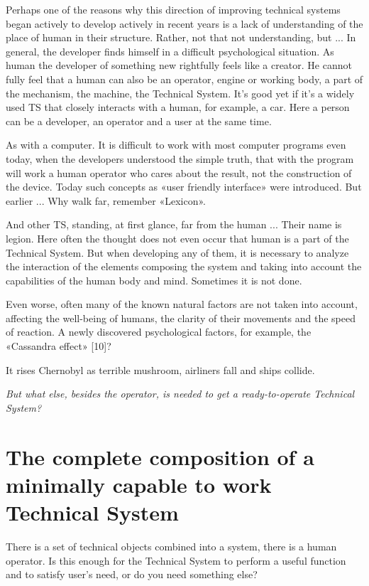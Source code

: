 \documentclass[11pt,a4paper]{article}
\begin{document}
Perhaps one of the reasons why this direction of improving technical systems
began actively to develop actively in recent years is a lack of understanding
of the place of human in their structure. Rather, not that not understanding,
but ... In general, the developer finds himself in a difficult psychological
situation. As human the developer of something new rightfully feels like a
creator. He cannot fully feel that a human can also be an operator, engine or
working body, a part of the mechanism, the machine, the Technical System.
It's good yet if it's a widely used TS that closely interacts with a human,
for example, a car. Here a person can be a developer, an operator and a user
at the same time.

As with a computer. It is difficult to work with most computer programs even
today, when the developers understood the simple truth, that with the program
will work a human operator who cares about the result, not the construction of
the device. Today such concepts as «user friendly interface» were introduced.
But earlier ... Why walk far, remember «Lexicon».

And other TS, standing, at first glance, far from the human ... Their name is
legion. Here often the thought does not even occur that human is a part of the
Technical System.  But when developing any of them, it is necessary to analyze
the interaction of the elements composing the system and taking into account
the capabilities of the human body and mind. Sometimes it is not done.

Even worse, often many of the known natural factors are not taken into
account, affecting the well-being of humans, the clarity of their movements
and the speed of reaction. A newly discovered psychological factors, for
example, the «Cassandra effect» [10]?

It rises Chernobyl as terrible mushroom, airliners fall and ships collide.

\emph{But what else, besides the operator, is needed to get a ready-to-operate
  Technical System?}

\section*{The complete composition of a minimally capable to work Technical
  System} 

There is a set of technical objects combined into a system, there is a human
operator. Is this enough for the Technical System to perform a useful function
and to satisfy user's need, or do you need something else?
\end{document}
